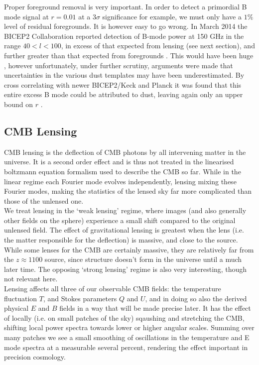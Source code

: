 \documentclass[a4paper,10pt]{article}
\begin{document}
Proper foreground removal is very important. In order to detect a primordial B mode signal at $r=0.01$ at a $3\sigma$ significance for example, we must only have a $1\%$ level of residual foregrounds. It is however easy to go wrong. In March 2014 the BICEP2 Collaboration reported detection of B-mode power at 150 GHz in the range $40<l<100$, in excess of that expected from lensing (see next section), and further greater than that expected from foregrounds \cite{bicep2cockup}. This would have been huge \cite{smokinggun}, however unfortunately, under further scrutiny, arguments were made that uncertainties in the various dust templates may have been underestimated. By cross correlating with newer BICEP2/Keck and Planck it was found that this entire excess B mode could be attributed to dust, leaving again only an upper bound on $r$ \cite{bicep2cockup2}.


\subsection{CMB Lensing}
\label{lensing}
CMB lensing is the deflection of CMB photons by all intervening matter in the universe. It is a second order effect and is thus not treated in the linearised boltzmann equation formalism used to describe the CMB so far. While in the linear regime each Fourier mode evolves independently, lensing mixing these Fourier modes, making the statistics of the lensed sky far more complicated than those of the unlensed one. \\

We treat lensing in the `weak lensing' regime, where images (and also generally other fields on the sphere) experience a small shift compared to the original unlensed field. The effect of gravitational lensing is greatest when the lens (i.e. the matter responsible for the deflection) is massive, and close to the source. While some lenses for the CMB are certainly massive, they are relatively far from the $z\approx1100$ source, since structure doesn't form in the universe until a much later time. The opposing `strong lensing' regime is also very interesting, though not relevant here.\\

Lensing affects all three of our observable CMB fields: the temperature fluctuation $T$, and Stokes parameters $Q$ and $U$, and in doing so also the derived physical $E$ and $B$ fields in a way that will be made precise later. It has the effect of locally (i.e. on small patches of the sky) sqaushing and stretching the CMB, shifting local power spectra towards lower or higher angular scales. Summing over many patches we see a small smoothing of oscillations in the temperature and E mode spectra at a measurable several percent, rendering the effect important in precision cosmology. \\
\end{document}

